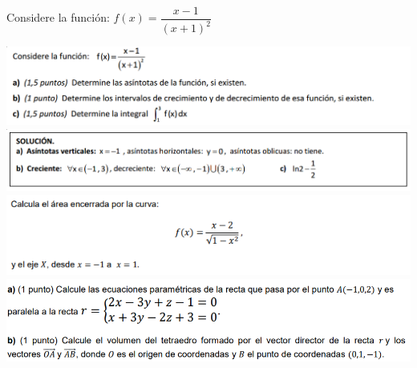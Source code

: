 \documentclass[addpoints,spanish, 12pt,a4paper]{exam}
\begin{document}
\begin{questions}

%
%







\question[4] Considere la función: $f(x)=\dfrac{x-1}{(x+1)^2}$

\begin{solution}
\includegraphics[width=1\textwidth]{2bac/2bac_cie/img/cieju19.png}
\includegraphics[width=1\textwidth]{2bac/2bac_cie/img/ciejun19sol.png}
\includegraphics[width=1\textwidth]{2bac/2bac_cie/img/cieres22.png}
\includegraphics[width=1\textwidth]{2bac/2bac_cie/img/cieresgeo.png}
\end{solution}



\end{questions}
\end{document}
